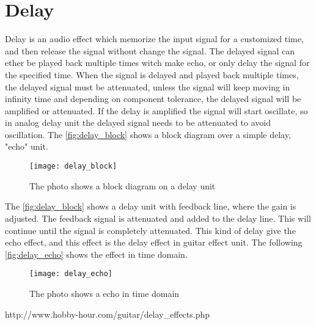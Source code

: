 \section{Delay}
Delay is an audio effect which memorize the input signal for a customized time, and then release the signal without change the signal. The delayed signal can ether be played back multiple times witch make echo, or only delay the signal for the specified time. When the signal is delayed and played back multiple times, the delayed signal must be attenuated, unless the signal will keep moving in infinity time and depending on component tolerance, the delayed signal will be amplified or attenuated. If the delay is amplified the signal will start oscillate, so in analog delay unit the delayed signal needs to be attenuated to avoid oscillation. The \autoref{fig:delay_block} shows a block diagram over a simple delay, "echo" unit.


\begin{figure} [htbp]
 \centering
  \texttt{[image: delay\_block]}
  \caption{The photo shows a block diagram on a delay unit}
  \label{fig:delay_block}
\end{figure}

The \autoref{fig:delay_block} shows a delay unit with feedback line, where the gain is adjusted. The feedback signal is attenuated and added to the delay line. This will continue until the signal is completely attenuated. This kind of delay give the echo effect, and this effect is the delay effect in guitar effect unit. The following \autoref{fig:delay_echo} shows the effect in time domain.

\begin{figure} [htbp]
 \centering
  \texttt{[image: delay\_echo]}
  \caption{The photo shows a echo in time domain}
  \label{fig:delay_echo}
\end{figure}

http://www.hobby-hour.com/guitar/delay_effects.php